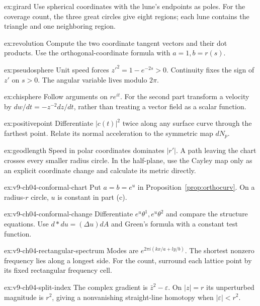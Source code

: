 \begin{hint}{ex:girard}
Use spherical coordinates with the lune's endpoints as poles. For the coverage count, the three great circles give eight regions; each lune contains the triangle and one neighboring region.
\end{hint}
\begin{hint}{ex:revolution}
Compute the two coordinate tangent vectors and their dot products. Use the orthogonal-coordinate formula with $a=1,b=r(s)$.
\end{hint}
\begin{hint}{ex:pseudosphere}
Unit speed forces $z'^2=1-e^{-2s}>0$. Continuity fixes the sign of $z'$ on $s>0$. The angular variable lives modulo $2\pi$.
\end{hint}
\begin{hint}{ex:chisphere}
Follow arguments on $re^{it}$. For the second part transform a velocity by $dw/dt=-z^{-2}dz/dt$, rather than treating a vector field as a scalar function.
\end{hint}
\begin{hint}{ex:positivepoint}
Differentiate $|c(t)|^2$ twice along any surface curve through the farthest point. Relate its normal acceleration to the symmetric map $dN_p$.
\end{hint}
\begin{hint}{ex:geodlength}
Speed in polar coordinates dominates $|r'|$. A path leaving the chart crosses every smaller radius circle. In the half-plane, use the Cayley map only as an explicit coordinate change and calculate its metric directly.
\end{hint}
\begin{hint}{ex:v9-ch04-conformal-chart}
Put $a=b=e^u$ in Proposition~\ref{prop:orthocurv}. On a radius-$r$ circle, $u$ is constant in part (c).
\end{hint}
\begin{hint}{ex:v9-ch04-conformal-change}
Differentiate $e^u\theta^1,e^u\theta^2$ and compare the structure equations. Use $d\ast du=(\Delta u)dA$ and Green's formula with a constant test function.
\end{hint}
\begin{hint}{ex:v9-ch04-rectangular-spectrum}
Modes are $e^{2\pi i(kx/a+ly/b)}$. The shortest nonzero frequency lies along a longest side. For the count, surround each lattice point by its fixed rectangular frequency cell.
\end{hint}
\begin{hint}{ex:v9-ch04-split-index}
The complex gradient is $\bar z^2-\varepsilon$. On $|z|=r$ its unperturbed magnitude is $r^2$, giving a nonvanishing straight-line homotopy when $|\varepsilon|<r^2$.
\end{hint}

